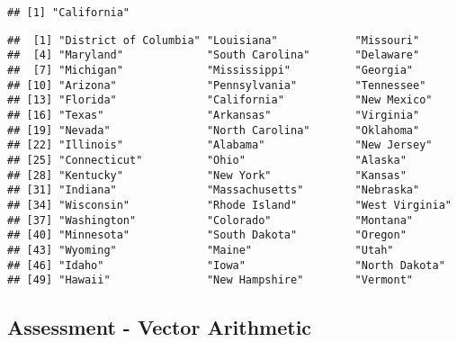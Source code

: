 \documentclass[]{article}
\newenvironment{Shaded}{\begin{snugshade}}{\end{snugshade}}
\newcommand{\CommentTok}[1]{\textcolor[rgb]{0.56,0.35,0.01}{\textit{#1}}}
\newcommand{\DataTypeTok}[1]{\textcolor[rgb]{0.13,0.29,0.53}{#1}}
\newcommand{\DecValTok}[1]{\textcolor[rgb]{0.00,0.00,0.81}{#1}}
\newcommand{\KeywordTok}[1]{\textcolor[rgb]{0.13,0.29,0.53}{\textbf{#1}}}
\newcommand{\NormalTok}[1]{#1}
\newcommand{\OperatorTok}[1]{\textcolor[rgb]{0.81,0.36,0.00}{\textbf{#1}}}
\newcommand{\OtherTok}[1]{\textcolor[rgb]{0.56,0.35,0.01}{#1}}
\newcommand{\StringTok}[1]{\textcolor[rgb]{0.31,0.60,0.02}{#1}}
\begin{document}
\begin{verbatim}
## [1] "California"
\end{verbatim}

\begin{Shaded}
\end{Shaded}

\begin{verbatim}
##  [1] "District of Columbia" "Louisiana"            "Missouri"            
##  [4] "Maryland"             "South Carolina"       "Delaware"            
##  [7] "Michigan"             "Mississippi"          "Georgia"             
## [10] "Arizona"              "Pennsylvania"         "Tennessee"           
## [13] "Florida"              "California"           "New Mexico"          
## [16] "Texas"                "Arkansas"             "Virginia"            
## [19] "Nevada"               "North Carolina"       "Oklahoma"            
## [22] "Illinois"             "Alabama"              "New Jersey"          
## [25] "Connecticut"          "Ohio"                 "Alaska"              
## [28] "Kentucky"             "New York"             "Kansas"              
## [31] "Indiana"              "Massachusetts"        "Nebraska"            
## [34] "Wisconsin"            "Rhode Island"         "West Virginia"       
## [37] "Washington"           "Colorado"             "Montana"             
## [40] "Minnesota"            "South Dakota"         "Oregon"              
## [43] "Wyoming"              "Maine"                "Utah"                
## [46] "Idaho"                "Iowa"                 "North Dakota"        
## [49] "Hawaii"               "New Hampshire"        "Vermont"
\end{verbatim}

\hypertarget{assessment---vector-arithmetic}{%
\subsection{Assessment - Vector
Arithmetic}\label{assessment---vector-arithmetic}}
\end{document}
